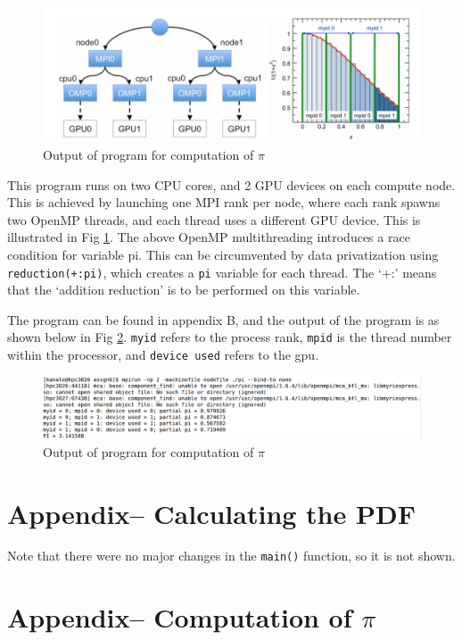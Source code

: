 \documentclass[11pt, oneside]{article}   	%
\begin{document}
\begin{figure}[!htbp] \label{fig:piSchematic}
	\centering
	\includegraphics[scale=0.4]{piSchematic.png}
	\caption{Output of program for computation of $\pi$}
\end{figure}

This program runs on two CPU cores, and 2 GPU devices on each compute node. This is achieved by launching one MPI rank per node, where each rank spawns two OpenMP threads, and each thread uses a different GPU device. This is illustrated in Fig \ref{fig:piSchematic}. The above OpenMP multithreading introduces a race condition for variable pi. This can be circumvented by data privatization using \texttt{reduction(+:pi)}, which creates a \texttt{pi} variable for each thread. The `+:' means that the `addition reduction' is to be performed on this variable.

The program can be found in appendix B, and the output of the program is as shown below in Fig \ref{fig:pi}. \texttt{myid} refers to the process rank, \texttt{mpid} is the thread number within the processor, and \texttt{device used} refers to the gpu.
\begin{figure}[!htbp] \label{fig:pi}
	\centering
	\includegraphics[scale=0.32]{piCalc.png}
	\caption{Output of program for computation of $\pi$}
\end{figure}

\pagebreak
\appendix
\section{Appendix-- Calculating the PDF}
Note that there were no major changes in the \texttt{main()} function, so it is not shown.


\section{Appendix-- Computation of $\pi$}

\end{document}
